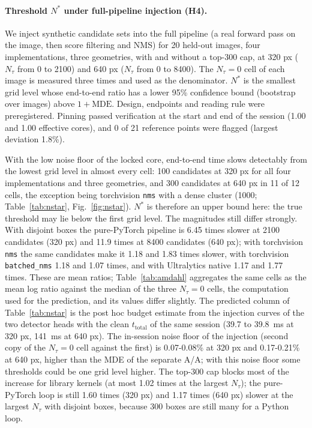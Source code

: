 \documentclass[a4paper,fleqn]{cas-dc}
\newcommand{\Ntau}{N_{\tau}}
\begin{document}
\paragraph{Threshold $N^{*}$ under full-pipeline injection (H4).}
We inject synthetic candidate sets into the full pipeline (a real forward pass on the image, then score filtering and NMS) for 20 held-out images, four implementations, three geometries, with and without a top-300 cap, at 320 px ($\Ntau$ from 0 to 2100) and 640 px ($\Ntau$ from 0 to 8400). The $\Ntau=0$ cell of each image is measured three times and used as the denominator. $N^{*}$ is the smallest grid level whose end-to-end ratio has a lower 95\% confidence bound (bootstrap over images) above $1+\mathrm{MDE}$. Design, endpoints and reading rule were preregistered. Pinning passed verification at the start and end of the session (1.00 and 1.00 effective cores), and 0 of 21 reference points were flagged (largest deviation 1.8\%).

With the low noise floor of the locked core, end-to-end time slows detectably from the lowest grid level in almost every cell: 100 candidates at 320 px for all four implementations and three geometries, and 300 candidates at 640 px in 11 of 12 cells, the exception being torchvision \texttt{nms} with a dense cluster (1000; Table~\ref{tab:nstar}, Fig.~\ref{fig:nstar}). $N^{*}$ is therefore an upper bound here: the true threshold may lie below the first grid level. The magnitudes still differ strongly. With disjoint boxes the pure-PyTorch pipeline is 6.45 times slower at 2100 candidates (320 px) and 11.9 times at 8400 candidates (640 px); with torchvision \texttt{nms} the same candidates make it 1.18 and 1.83 times slower, with torchvision \texttt{batched\_nms} 1.18 and 1.07 times, and with Ultralytics native 1.17 and 1.77 times. These are mean ratios; Table~\ref{tab:amdahl} aggregates the same cells as the mean log ratio against the median of the three $\Ntau=0$ cells, the computation used for the prediction, and its values differ slightly. The predicted column of Table~\ref{tab:nstar} is the post hoc budget estimate from the injection curves of the two detector heads with the clean $t_{\mathrm{total}}$ of the same session (39.7 to 39.8~ms at 320 px, 141~ms at 640 px). The in-session noise floor of the injection (second copy of the $\Ntau=0$ cell against the first) is 0.07-0.08\% at 320 px and 0.17-0.21\% at 640 px, higher than the MDE of the separate A/A; with this noise floor some thresholds could be one grid level higher. The top-300 cap blocks most of the increase for library kernels (at most 1.02 times at the largest $\Ntau$); the pure-PyTorch loop is still 1.60 times (320 px) and 1.17 times (640 px) slower at the largest $\Ntau$ with disjoint boxes, because 300 boxes are still many for a Python loop.
\end{document}
